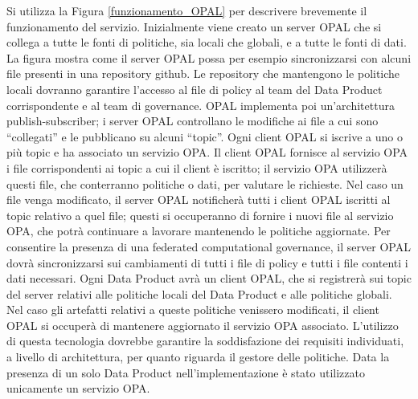 \documentclass[a4paper,12pt]{report}
\begin{document}
Si utilizza la Figura \ref{funzionamento_OPAL} per descrivere brevemente il funzionamento del servizio.
Inizialmente viene creato un server OPAL che si collega a tutte le fonti di politiche, sia locali che globali, e a tutte le fonti di dati.
La figura mostra come il server OPAL possa per esempio sincronizzarsi con alcuni file presenti in una repository github.
Le repository che mantengono le politiche locali dovranno garantire l'accesso al file di policy al team del Data Product corrispondente e al team di governance.
OPAL implementa poi un'architettura publish-subscriber;
i server OPAL controllano le modifiche ai file a cui sono ``collegati'' e le pubblicano su alcuni ``topic''.
Ogni client OPAL si iscrive a uno o più topic e ha associato un servizio OPA.
Il client OPAL fornisce al servizio OPA i file corrispondenti ai topic a cui il client è iscritto; il servizio OPA utilizzerà questi file, che conterranno politiche o dati, per valutare le richieste.
Nel caso un file venga modificato, il server OPAL notificherà tutti i client OPAL iscritti al topic relativo a quel file; questi si occuperanno di fornire i nuovi file al servizio OPA, che potrà continuare a lavorare mantenendo le politiche aggiornate.
Per consentire la presenza di una federated computational governance, il server OPAL dovrà sincronizzarsi sui cambiamenti di tutti i file di policy e tutti i file contenti i dati necessari.
Ogni Data Product avrà un client OPAL, che si registrerà sui topic del server relativi alle politiche locali del Data Product e alle politiche globali.
Nel caso gli artefatti relativi a queste politiche venissero modificati, il client OPAL si occuperà di mantenere aggiornato il servizio OPA associato.
L'utilizzo di questa tecnologia dovrebbe garantire la soddisfazione dei requisiti individuati, a livello di architettura, per quanto riguarda il gestore delle politiche.
Data la presenza di un solo Data Product nell'implementazione è stato utilizzato unicamente un servizio OPA.
\end{document}
